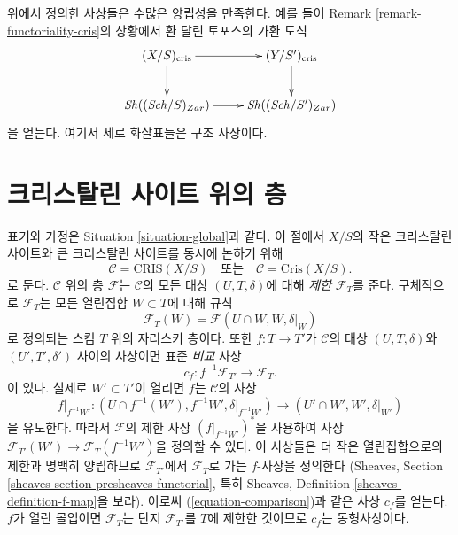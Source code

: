 \begin{remark}[양립성]
\label{remark-compatibilities}
위에서 정의한 사상들은 수많은 양립성을 만족한다. 예를 들어
Remark \ref{remark-functoriality-cris}의 상황에서 환 달린 토포스의
가환 도식
$$
\xymatrix{
(X/S)_{\text{cris}} \ar[d] \ar[r] & (Y/S')_{\text{cris}} \ar[d] \\
\Sh((\Sch/S)_{Zar}) \ar[r] & \Sh((\Sch/S')_{Zar})
}
$$
을 얻는다. 여기서 세로 화살표들은 구조 사상이다.
\end{remark}



\section{크리스탈린 사이트 위의 층}
\label{section-sheaves}

\noindent
표기와 가정은 Situation \ref{situation-global}과 같다.
이 절에서 $X/S$의 작은 크리스탈린 사이트와 큰 크리스탈린 사이트를
동시에 논하기 위해
$$
\mathcal{C} = \text{CRIS}(X/S)
\quad\text{또는}\quad
\mathcal{C} = \text{Cris}(X/S).
$$
로 둔다. $\mathcal{C}$ 위의 층 $\mathcal{F}$는 $\mathcal{C}$의
모든 대상 $(U, T, \delta)$에 대해 {\it 제한} $\mathcal{F}_T$를 준다.
구체적으로 $\mathcal{F}_T$는 모든 열린집합 $W \subset T$에 대해
규칙
$$
\mathcal{F}_T(W) = \mathcal{F}(U \cap W, W, \delta|_W)
$$
로 정의되는 스킴 $T$ 위의 자리스키 층이다. 또한
$f : T \to T'$가 $\mathcal{C}$의 대상 $(U, T, \delta)$와
$(U', T', \delta')$ 사이의 사상이면 표준 {\it 비교} 사상
\begin{equation}
\label{equation-comparison}
c_f : f^{-1}\mathcal{F}_{T'} \longrightarrow \mathcal{F}_T.
\end{equation}
이 있다. 실제로 $W' \subset T'$이 열리면 $f$는 $\mathcal{C}$의 사상
$$
f|_{f^{-1}W'} :
(U \cap f^{-1}(W'), f^{-1}W', \delta|_{f^{-1}W'})
\longrightarrow
(U' \cap W', W', \delta|_{W'})
$$
을 유도한다. 따라서 $\mathcal{F}$의 제한 사상
$(f|_{f^{-1}W'})^*$을 사용하여 사상
$\mathcal{F}_{T'}(W') \to \mathcal{F}_T(f^{-1}W')$을 정의할 수 있다.
이 사상들은 더 작은 열린집합으로의 제한과 명백히 양립하므로
$\mathcal{F}_{T'}$에서 $\mathcal{F}_T$로 가는 $f$-사상을 정의한다
(Sheaves, Section \ref{sheaves-section-presheaves-functorial}, 특히
Sheaves, Definition \ref{sheaves-definition-f-map}을 보라).
이로써 (\ref{equation-comparison})과 같은 사상 $c_f$를 얻는다.
$f$가 열린 몰입이면 $\mathcal{F}_T$는 단지
$\mathcal{F}_{T'}$를 $T$에 제한한 것이므로 $c_f$는 동형사상이다.

